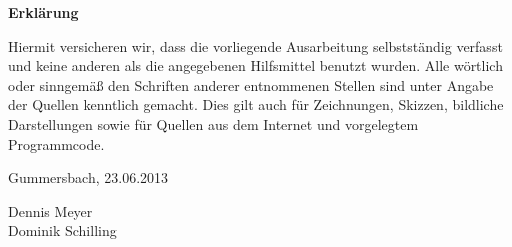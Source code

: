 \documentclass[a4paper]{article}
\begin{document}
\newpage

\listoffigures

\newpage 

\listoftables

\newpage
\begin{center}

\textbf{\large {Erklärung}}\\
\end{center}
\normalsize
\parskip 6pt
\parindent 0pt
Hiermit versicheren wir, dass die vorliegende Ausarbeitung selbstständig verfasst und keine anderen als die angegebenen Hilfsmittel benutzt wurden. Alle wörtlich oder sinngemäß den Schriften anderer entnommenen Stellen sind unter Angabe der Quellen kenntlich gemacht. Dies gilt auch für Zeichnungen, Skizzen, bildliche Darstellungen sowie für Quellen aus dem Internet und vorgelegtem Programmcode.

\parskip 24pt
\parindent 0pt
Gummersbach, 23.06.2013

\parskip 24pt
\parindent 0pt

Dennis Meyer \\
Dominik Schilling
\end{document}
